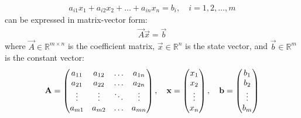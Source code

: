 \begin{enumerate}[label=\thesubsection.\arabic*, ref=\thesubsection.\theenumi,itemsep=0pt]
\begin{itemize}
\begin{align}
a_{i1} x_1 + a_{i2} x_2 + \dots + a_{in} x_n = b_i, \quad i = 1, 2, \dots, m
\end{align}
can be expressed in matrix-vector form:
\begin{align}
\vec{A}\vec{x} = \vec{b} \label{eq:EE26BTECH11213-matrix_system_linear}
\end{align}
where $\vec{A} \in \mathbb{R}^{m \times n}$ is the coefficient matrix, $\vec{x} \in \mathbb{R}^n$ is the state vector, and $\vec{b} \in \mathbb{R}^m$ is the constant vector:
\begin{align}
\mathbf{A} = \begin{pmatrix}
a_{11} & a_{12} & \dots & a_{1n} \\
a_{21} & a_{22} & \dots & a_{2n} \\
\vdots & \vdots & \ddots & \vdots \\
a_{m1} & a_{m2} & \dots & a_{mn}
\end{pmatrix}, \quad
\mathbf{x} = \begin{pmatrix}x_1 \\ x_2 \\ \vdots \\ x_n\end{pmatrix}, \quad
\mathbf{b} = \begin{pmatrix}b_1 \\ b_2 \\ \vdots \\ b_m\end{pmatrix}
\end{align}


\end{itemize}
\end{enumerate}
